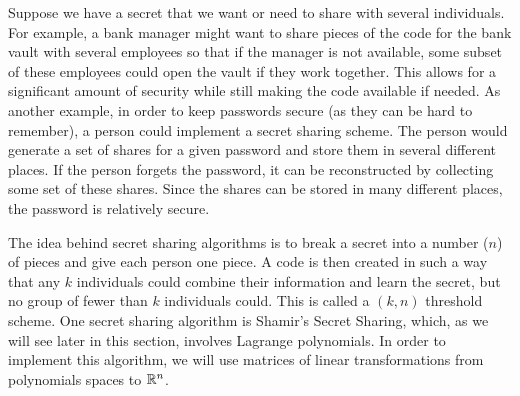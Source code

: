  \label{chap:transformation_matrix}

\vspace*{-17 pt}

\vspace*{13 pt}

\label{sec:appl_secret}

Suppose we have a secret that we want or need to share with several individuals. For example, a bank manager might want to share pieces of the code for the bank vault with several employees so that if the manager is not available, some subset of these employees could open the vault if they work together. This allows for a significant amount of security while still making the code available if needed. As another example, in order to keep passwords secure (as they can be hard to remember), a person could implement a secret sharing scheme. The person would generate a set of shares for a given password and store them in several different places. If the person forgets the password, it can be reconstructed by collecting some set of these shares. Since the shares can be stored in many different places, the password is relatively secure.  

The idea behind secret sharing algorithms is to break a secret into a number ($n$) of pieces and give each person one piece. A code is then created in such a way that any $k$ individuals could combine their information and learn the secret, but no group of fewer than $k$ individuals could. This is called a $(k,n)$ threshold scheme. One secret sharing algorithm is Shamir's Secret Sharing, which, as we will see later in this section, involves Lagrange polynomials. In order to implement this algorithm, we will use matrices of linear transformations from polynomials spaces to $\mathbb{R}^n$. 


